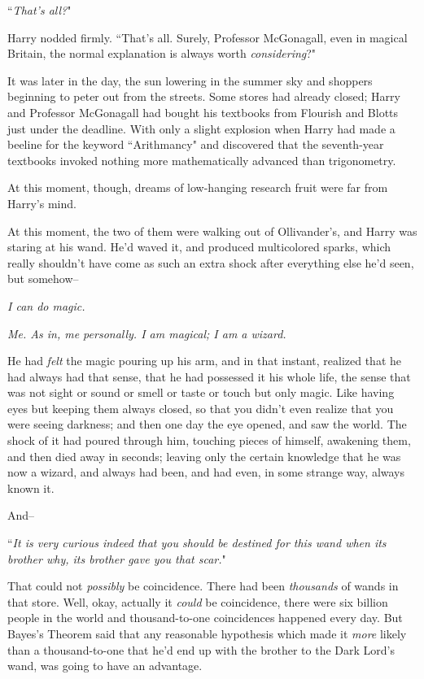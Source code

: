 ``\emph{That's all?}"

Harry nodded firmly. ``That's all. Surely, Professor McGonagall, even in magical Britain, the normal explanation is always worth \emph{considering}?"

\later

It was later in the day, the sun lowering in the summer sky and shoppers beginning to peter out from the streets. Some stores had already closed; Harry and Professor McGonagall had bought his textbooks from Flourish and Blotts just under the deadline. With only a slight explosion when Harry had made a beeline for the keyword ``Arithmancy" and discovered that the seventh-year textbooks invoked nothing more mathematically advanced than trigonometry.

At this moment, though, dreams of low-hanging research fruit were far from Harry's mind.

At this moment, the two of them were walking out of Ollivander's, and Harry was staring at his wand. He'd waved it, and produced multicolored sparks, which really shouldn't have come as such an extra shock after everything else he'd seen, but somehow\---

\emph{I can do magic.}

\emph{Me. As in, me personally. I am magical; I am a wizard.}

He had \emph{felt} the magic pouring up his arm, and in that instant, realized that he had always had that sense, that he had possessed it his whole life, the sense that was not sight or sound or smell or taste or touch but only magic. Like having eyes but keeping them always closed, so that you didn't even realize that you were seeing darkness; and then one day the eye opened, and saw the world. The shock of it had poured through him, touching pieces of himself, awakening them, and then died away in seconds; leaving only the certain knowledge that he was now a wizard, and always had been, and had even, in some strange way, always known it.

And\---

``\emph{It is very curious indeed that you should be destined for this wand when its brother why, its brother gave you that scar.}"

That could not \emph{possibly} be coincidence. There had been \emph{thousands} of wands in that store. Well, okay, actually it \emph{could} be coincidence, there were six billion people in the world and thousand-to-one coincidences happened every day. But Bayes's Theorem said that any reasonable hypothesis which made it \emph{more} likely than a thousand-to-one that he'd end up with the brother to the Dark Lord's wand, was going to have an advantage.

